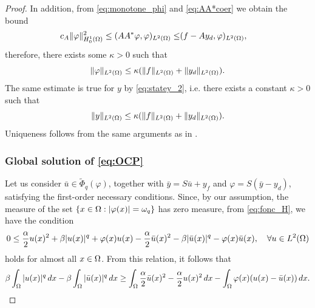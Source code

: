 \begin{proof}
		In addition, from  \eqref{eq:monotone_phi} and \eqref{eq:AA*coer}  we obtain the bound 
		\begin{align}
			c_A\lVert \varphi \rVert_{H_{0}^{1}(\Omega)} ^2\leq	(AA^*\varphi,\varphi)_{L^2(\Omega)} \leq & (f-Ay_d,\varphi)_{L^2(\Omega)},
		\end{align}
		therefore, there exists some $\kappa>0$ such that 
		\begin{equation}
			\lVert \varphi \rVert_{L^2(\Omega)} \leq\kappa ( \lVert f \rVert_{L^2(\Omega)} + \lVert y_d \rVert_{L^2(\Omega)}).\\
		\end{equation}
		The same estimate is true for $y$ by \eqref{eq:statey_2}, i.e. there exists a constant $\kappa>0$ such that
		\begin{equation}
			\lVert y \rVert_{L^2(\Omega)} \leq\kappa ( \lVert f \rVert_{L^2(\Omega)} + \lVert y_d \rVert_{L^2(\Omega)}).\\
		\end{equation}
		Uniqueness follows from the same arguments as in \cite{ito-kunisch2014}.
		
		\subsubsection*{Global solution of \eqref{eq:OCP}} Let us consider $\bar u \in  \tilde\Phi_q (\varphi)$, %
		together with $\bar y = S \bar u + y_f$ and $\varphi = S(\bar y -y_d) $, satisfying the first-order necessary conditions. Since, by our assumption, the measure of the set $\{x\in \Omega : |\varphi(x)|=\omega_q \}$ has zero measure, from \eqref{eq:fonc_H}, we have the condition 
		$$ 0 \leq \frac{\alpha}{2}   u(x)^2 + \beta |  u(x)|^q + \varphi (x)  u(x)-\frac{\alpha}{2} \bar u(x)^2 - \beta |\bar u(x)|^q - \varphi (x) \bar u(x), \quad \forall u  \in L^2(\Omega)$$ 
		holds for almost all $x\in \Omega$. From this relation, it follows that 
       \begin{equation}\label{eq:diffnonconvex}
           \beta\int_\Omega |u(x)|^q \, dx - \beta\int_\Omega |\bar u(x)|^q \, dx \geq \int_\Omega \frac{\alpha}{2} \bar u(x)^2 - \frac{\alpha}{2}  u(x)^2\, dx - \int_\Omega \varphi(x) ( u(x)-\bar u(x)) \, dx.
       \end{equation}


\end{proof}
